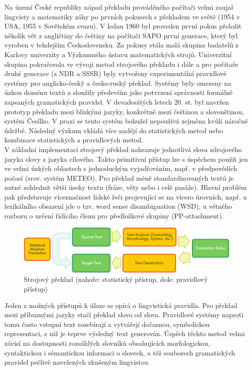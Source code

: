 \documentclass[]{../../metanetpaper}
\begin{document}
\begin{multicols}{2}
Na území České republiky nápad překladu prováděného počítači velmi zaujal lingvisty a matematiky záhy po prvních pokusech s překladem ve světě (1954 v USA, 1955 v Sovětském svazu). V lednu 1960 byl proveden první pokus přeložit několik vět z angličtiny do češtiny na počítači SAPO první generace, který byl vyroben v tehdejším Československu. Za pokusy stála malá skupina badatelů z Karlovy univerzity a Výzkumného ústavu matematických strojů. Univerzitní skupina pokračovala ve vývoji metod strojového překladu i dále a pro počítače druhé generace (z NDR a SSSR) byly vytvořeny experimentální pravidlové systémy pro anglicko-český a česko-ruský překlad. Systémy byly omezeny na úzkou doménu textů a sloužily především jako potvrzení správnosti formálně zapsaných gramatických pravidel. V devadesátých letech 20. st. byl navržen prototyp překladu mezi blízkými jazyky, konkrétně mezi češtinou a slovenštinou, systém Česílko\cite{Note18}. V praxi se tento systém bohužel nepoužívá zejména kvůli náročné údržbě. Následný výzkum vkládá více nadějí do statistických metod nebo kombinace statistických a pravidlových metod.\\
V základní implementaci strojový překlad nahrazuje jednotlivá slova zdrojového jazyka slovy z jazyka cílového. Takto primitivní přístup lze s úspěchem použít jen ve velmi úzkých oblastech s jednoduchým vyjadřováním, např. v předpovědích počasí (srov. systém METEO\cite{Note19}). Pro překlad méně standardizovaných textů je nutné zohlednit větší úseky textu (fráze, věty nebo i celé pasáže). Hlavní problém pak představuje víceznačnost lidské řeči projevující se na vícero úrovních, např. u lexikálního obsazení jde o tzv. word sense disambiguation (WSD), u větného rozboru o určení řídícího členu pro předložkové skupiny (PP-attachment).
\begin{figure}[htb]
  \center
  \includegraphics[width=\textwidth]{../_media/english/machine_translation}
  \caption{Strojový překlad (nahoře: statistický přístup, dole: pravidlový přístup)}
  \label{fig:mtarch_en}
\end{figure}
Jeden z možných přístupů k úloze se opírá o lingvistická pravidla. Pro překlad mezi příbuznými jazyky stačí překlad slovo od slova. Pravidlové systémy naproti tomu často vstupní text rozebírají a vytvářejí dočasnou, symbolickou reprezentaci, z níž je teprve výsledný text generován. Úspěch těchto metod velmi závisí na dostupnosti rozsáhlých slovníků obsahujících morfologickou, syntaktickou i sémantickou informaci o slovech, a též souborech gramatických pravidel pečlivě navržených zkušeným lingvistou.\\

\end{multicols}
\end{document}
